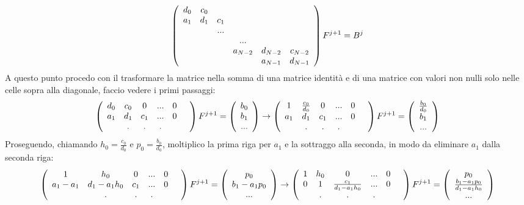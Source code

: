 \begin{equation}
\left( \begin{array}{cccccc}
d_0&c_0&&&\\
a_1&d_1&c_1&\\
&&...&&&\\
&&&...&&\\
&&&a_{N-2}&d_{N-2}&c_{N-2}\\
&&&&a_{N-1}&d_{N-1}\\
\end{array} \right) F^{j+1} = 
B^j
\end{equation}
A questo punto procedo con il trasformare la matrice nella somma di una matrice identit\`a e di una matrice con valori non nulli solo nelle celle sopra alla diagonale, faccio vedere i primi passaggi:
\begin{equation}
\left( \begin{array}{cccccc}
d_0&c_0&0&...&0\\
a_1&d_1&c_1&...&0\\
&.&.&.&&\\
\end{array} \right) F^{j+1} = \left( \begin{array}{c}
b_0\\b_1\\...
\end{array} \right)\to
\left( \begin{array}{cccccc}
1&\frac{c_0}{d_0}&0&...&0\\
a_1&d_1&c_1&...&0\\
&.&.&.&&\\
\end{array} \right) F^{j+1} = \left( \begin{array}{c}
\frac{b_0}{d_0}\\b_1\\...
\end{array} \right)
\end{equation}
Proseguendo, chiamando $h_0 = \frac{c_0}{d_0}$ e $p_0 = \frac{b_0}{d_0}$, moltiplico la prima riga per $a_1$ e la sottraggo alla seconda, in modo da eliminare $a_1$ dalla seconda riga:
\begin{equation}
\left( \begin{array}{cccccc}
1&h_0&0&...&0\\
a_1-a_1 &d_1 -a_1 h_0&c_1&...&0\\
&.&.&.&&\\
\end{array} \right) F^{j+1} = \left( \begin{array}{c}
p_0\\b_1-a_1p_0\\...
\end{array} \right)\to
\left( \begin{array}{cccccc}
1&h_0&0&...&0\\
0 &1&\frac{c_1}{d_1 -a_1 h_0}&...&0\\
&.&.&.&&\\
\end{array} \right) F^{j+1} = \left( \begin{array}{c}
p_0\\\frac{b_1-a_1p_0}{d_1 -a_1 h_0}\\...
\end{array} \right)
\end{equation}

